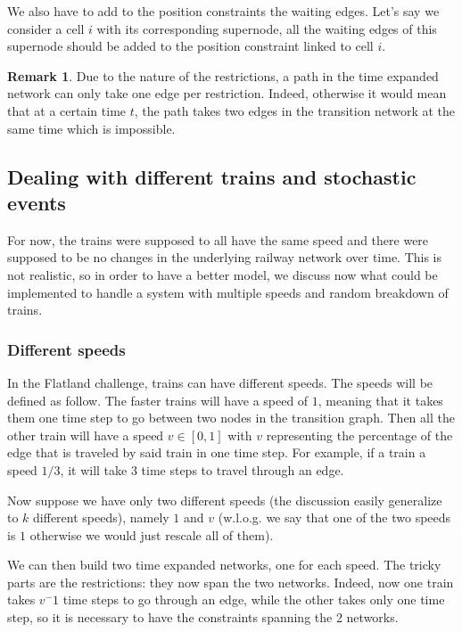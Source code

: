 \documentclass[14pt,a4paper]{article}
\theoremstyle{definition}
\newtheorem*{remark}{Remark}
\numberwithin{equation}{subsection}
\begin{document}
We also have to add to the position constraints the waiting edges. Let's say we consider a cell $i$ with its corresponding supernode, all the waiting edges of this supernode should be added to the position constraint linked to cell $i$.

\begin{remark}
	Due to the nature of the restrictions, a path in the time expanded network can only take one edge per restriction. Indeed, otherwise it would mean that at a certain time $t$, the path takes two edges in the transition network at the same time which is impossible.
\end{remark}



\subsection{Dealing with different trains and stochastic events}

For now, the trains were supposed to all have the same speed and there were supposed to be no changes in the underlying railway network over time. This is not realistic, so in order to have a better model, we discuss now what could be implemented to handle a system with multiple speeds and random breakdown of trains.


\subsubsection{Different speeds}

In the Flatland challenge, trains can have different speeds. The speeds will be defined as follow. The faster trains will have a speed of $1$, meaning that it takes them one time step to go between two nodes in the transition graph. Then all the other train will have a speed $v \in [0,1]$ with $v$ representing the percentage of the edge that is traveled by said train in one time step. For example, if a train a speed $1/3$, it will take 3 time steps to travel through an edge.

Now suppose we have only two different speeds (the discussion easily generalize to $k$ different speeds), namely $1$ and $v$ (w.l.o.g. we say that one of the two speeds is $1$ otherwise we would just rescale all of them).

We can then build two time expanded networks, one for each speed. The tricky parts are the restrictions: they now span the two networks. Indeed, now one train takes $v^-1$ time steps to go through an edge, while the other takes only one time step, so it is necessary to have the constraints spanning the 2 networks.
\end{document}
